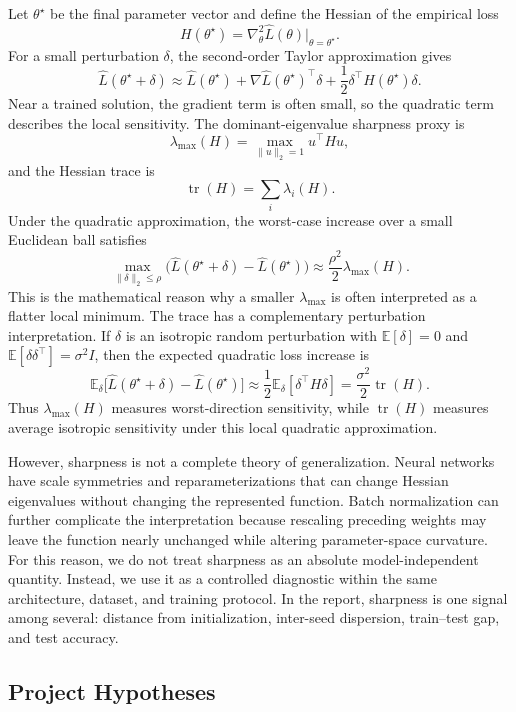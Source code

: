 \documentclass[11pt]{article}
\begin{document}
Let $\theta^\star$ be the final parameter vector and define the Hessian of the empirical loss
\[
H(\theta^\star)
= \nabla^2_\theta \widehat L(\theta)\big|_{\theta=\theta^\star}.
\]
For a small perturbation $\delta$, the second-order Taylor approximation gives
\[
\widehat L(\theta^\star+\delta)
\approx
\widehat L(\theta^\star)
+ \nabla \widehat L(\theta^\star)^\top \delta
+ \frac{1}{2}\delta^\top H(\theta^\star)\delta.
\]
Near a trained solution, the gradient term is often small, so the quadratic term describes the local sensitivity. The dominant-eigenvalue sharpness proxy is
\[
\lambda_{\max}(H)
= \max_{\|u\|_2=1} u^\top H u,
\]
and the Hessian trace is
\[
\operatorname{tr}(H)
= \sum_i \lambda_i(H).
\]
Under the quadratic approximation, the worst-case increase over a small Euclidean ball satisfies
\[
\max_{\|\delta\|_2\le \rho}
\big(\widehat L(\theta^\star+\delta)-\widehat L(\theta^\star)\big)
\approx
\frac{\rho^2}{2}\lambda_{\max}(H).
\]
This is the mathematical reason why a smaller $\lambda_{\max}$ is often interpreted as a flatter local minimum. The trace has a complementary perturbation interpretation. If $\delta$ is an isotropic random perturbation with $\mathbb{E}[\delta]=0$ and $\mathbb{E}[\delta\delta^\top]=\sigma^2 I$, then the expected quadratic loss increase is
\[
\mathbb{E}_{\delta}
\big[\widehat L(\theta^\star+\delta)-\widehat L(\theta^\star)\big]
\approx
\frac{1}{2}\mathbb{E}_{\delta}[\delta^\top H\delta]
=
\frac{\sigma^2}{2}\operatorname{tr}(H).
\]
Thus $\lambda_{\max}(H)$ measures worst-direction sensitivity, while $\operatorname{tr}(H)$ measures average isotropic sensitivity under this local quadratic approximation.

However, sharpness is not a complete theory of generalization. Neural networks have scale symmetries and reparameterizations that can change Hessian eigenvalues without changing the represented function. Batch normalization can further complicate the interpretation because rescaling preceding weights may leave the function nearly unchanged while altering parameter-space curvature. For this reason, we do not treat sharpness as an absolute model-independent quantity. Instead, we use it as a controlled diagnostic within the same architecture, dataset, and training protocol. In the report, sharpness is one signal among several: distance from initialization, inter-seed dispersion, train--test gap, and test accuracy.

\subsection{Project Hypotheses}
\end{document}

